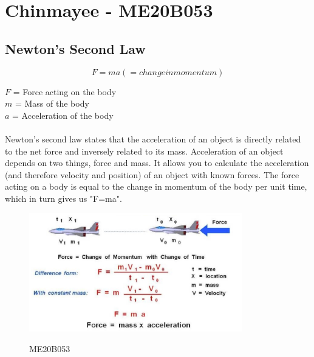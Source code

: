 
%
\section{Chinmayee - ME20B053}
\subsection{Newton's Second Law} \cite{Newton_second_law}

\begin{equation}
F=ma (= change in momentum)
\end{equation}

$F$ = Force acting on the body \\
$m$ = Mass of the body \\
$a$ = Acceleration of the body \\

\paragraph{}
Newton's second law states that the acceleration of an object is directly related to the net force and inversely related to its mass. Acceleration of an object depends on two things, force and mass. It allows you to calculate the acceleration (and therefore velocity and position) of an object with known forces. The force acting on a body is equal to the change in momentum of the body per unit time, which in turn gives us "F=ma".  

\begin{figure}[!ht]
\includegraphics[width=350px]{me20b053/me20b053.eps}
\caption{ME20B053} \cite{Newton_discription}
\label{fig : Newton's Second Law}
\end{figure}

%
%

%
